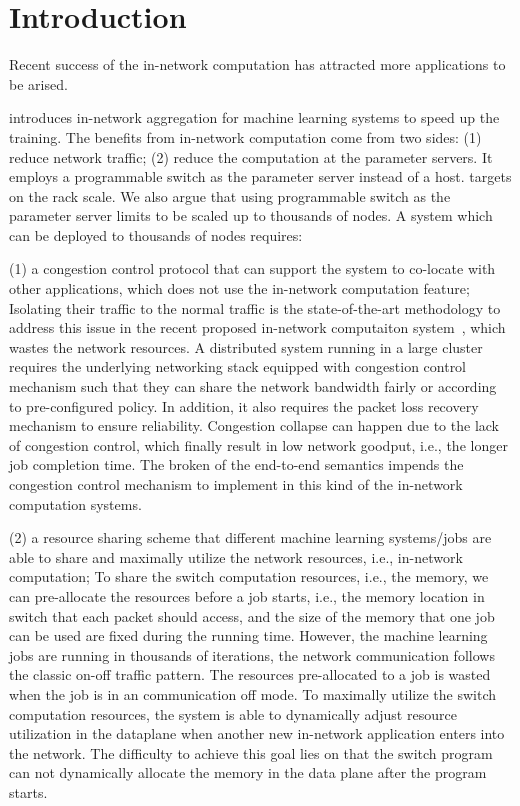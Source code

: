 \section{Introduction}
Recent success of the in-network computation has attracted more 
applications to be arised.  

\switchml introduces in-network aggregation for machine learning systems
to speed up the training. The benefits from in-network computation 
come from two sides: (1) reduce network traffic; (2) reduce the computation
at the parameter servers. 
It employs a programmable switch as the parameter server instead of a host. 
\switchml targets on the rack scale. We also argue that using programmable switch
as the parameter server limits \switchml to be scaled up to 
thousands of nodes. A system which can be deployed to thousands of nodes requires:


(1) a congestion control protocol that can support the system to
co-locate with other applications, which does not use the in-network computation feature;
Isolating their traffic to the normal traffic is the state-of-the-art methodology to 
address this issue in the recent proposed in-network computaiton system~\cite{netcache, netchain, harmonia, switchml}, which wastes the network resources. 
A distributed system running in a large cluster requires the underlying networking stack equipped with 
congestion control mechanism such that they can share the network
bandwidth fairly or according to pre-configured policy.
In addition, it also requires the packet loss recovery mechanism to ensure 
reliability. Congestion collapse can happen due to the lack of congestion control, 
which finally result in low network goodput, i.e., the longer job completion time. 
The broken of the end-to-end semantics impends the congestion control mechanism to implement
in this kind of the in-network computation systems. 


(2) a resource sharing scheme that different machine learning systems/jobs
are able to share and maximally utilize the network resources, i.e., in-network computation;
To share the switch computation resources, i.e., the memory, we can pre-allocate 
the resources before a job starts, i.e., 
the memory location in switch that each packet should access, and the
size of the memory that one job can be used are fixed during the running time.
However, the machine learning jobs are running in thousands of iterations, 
the network communication
follows the classic on-off traffic pattern. The resources pre-allocated to 
a job is wasted when the job is in an communication off mode.
To maximally utilize the switch computation resources, 
the system is able to dynamically adjust resource utilization in
the dataplane when another new in-network application enters into the network.
The difficulty to achieve this goal lies on that the switch program can not dynamically 
allocate the memory in the data plane after the program starts.

